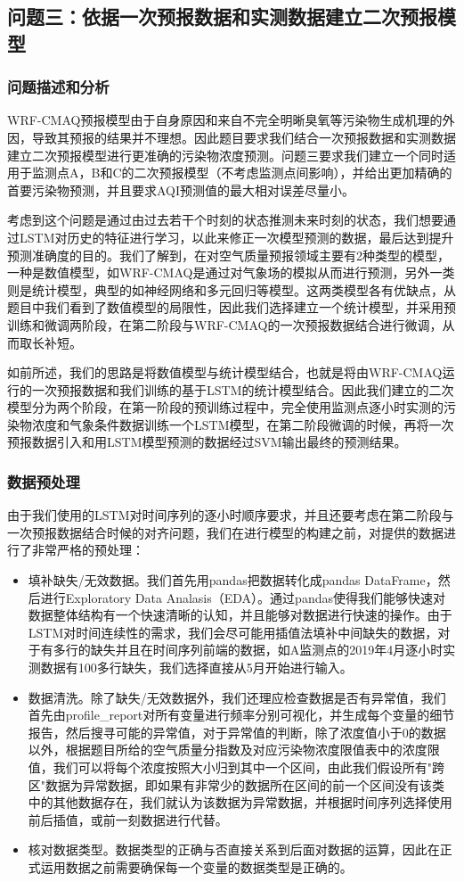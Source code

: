 \documentclass[bwprint]{gmcmthesis}
\numberwithin{figure}{section}
\begin{document}
\subsection{问题三：依据一次预报数据和实测数据建立二次预报模型}
\subsubsection{问题描述和分析}
WRF-CMAQ预报模型由于自身原因和来自不完全明晰臭氧等污染物生成机理的外因，导致其预报的结果并不理想。因此题目要求我们结合一次预报数据和实测数据建立二次预报模型进行更准确的污染物浓度预测。问题三要求我们建立一个同时适用于监测点A，B和C的二次预报模型（不考虑监测点间影响），并给出更加精确的首要污染物预测，并且要求AQI预测值的最大相对误差尽量小。

考虑到这个问题是通过由过去若干个时刻的状态推测未来时刻的状态，我们想要通过LSTM对历史的特征进行学习，以此来修正一次模型预测的数据，最后达到提升预测准确度的目的。我们了解到，在对空气质量预报领域主要有2种类型的模型，一种是数值模型，如WRF-CMAQ是通过对气象场的模拟从而进行预测，另外一类则是统计模型，典型的如神经网络和多元回归等模型。这两类模型各有优缺点，从题目中我们看到了数值模型的局限性，因此我们选择建立一个统计模型，并采用预训练和微调两阶段，在第二阶段与WRF-CMAQ的一次预报数据结合进行微调，从而取长补短。

如前所述，我们的思路是将数值模型与统计模型结合，也就是将由WRF-CMAQ运行的一次预报数据和我们训练的基于LSTM的统计模型结合。因此我们建立的二次模型分为两个阶段，在第一阶段的预训练过程中，完全使用监测点逐小时实测的污染物浓度和气象条件数据训练一个LSTM模型，在第二阶段微调的时候，再将一次预报数据引入和用LSTM模型预测的数据经过SVM输出最终的预测结果。
\subsubsection{数据预处理}
由于我们使用的LSTM对时间序列的逐小时顺序要求，并且还要考虑在第二阶段与一次预报数据结合时候的对齐问题，我们在进行模型的构建之前，对提供的数据进行了非常严格的预处理：
\begin{itemize}
	\item 填补缺失/无效数据。我们首先用pandas把数据转化成pandas DataFrame，然后进行Exploratory Data Analasis（EDA）。通过pandas使得我们能够快速对数据整体结构有一个快速清晰的认知，并且能够对数据进行快速的操作。由于LSTM对时间连续性的需求，我们会尽可能用插值法填补中间缺失的数据，对于有多行的缺失并且在时间序列前端的数据，如A监测点的2019年4月逐小时实测数据有100多行缺失，我们选择直接从5月开始进行输入。
	\item 数据清洗。除了缺失/无效数据外，我们还理应检查数据是否有异常值，我们首先由profile_report对所有变量进行频率分别可视化，并生成每个变量的细节报告，然后搜寻可能的异常值，对于异常值的判断，除了浓度值小于0的数据以外，根据题目所给的空气质量分指数及对应污染物浓度限值表中的浓度限值，我们可以将每个浓度按照大小归到其中一个区间，由此我们假设所有"跨区"数据为异常数据，即如果有非常少的数据所在区间的前一个区间没有该类中的其他数据存在，我们就认为该数据为异常数据，并根据时间序列选择使用前后插值，或前一刻数据进行代替。
	\item 核对数据类型。数据类型的正确与否直接关系到后面对数据的运算，因此在正式运用数据之前需要确保每一个变量的数据类型是正确的。
\end{itemize}
\end{document}
